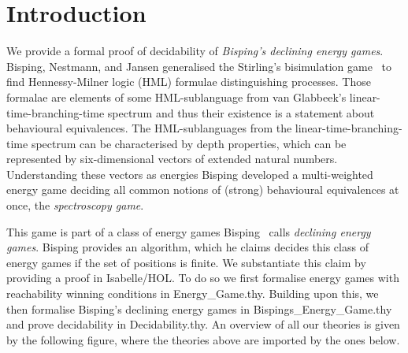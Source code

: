 \newpage
\section{Introduction}
 
\noindent
We provide a formal proof of decidability of \textit{Bisping's declining energy games}. 
Bisping, Nestmann, and Jansen \cite{bispingNestmann,bispingJansenNestmann} generalised the 
Stirling's bisimulation game~\cite{stirling-bisim} to find Hennessy-Milner logic (HML) formulae distinguishing 
processes. Those formalae are elements of some HML-sublanguage from 
van Glabbeek’s linear-time-branching-time spectrum\cite{vanGlabbeek} 
and thus their existence is a statement about behavioural equivalences.
The HML-sublanguages from the linear-time-branching-time spectrum can be characterised by depth properties, 
which can be represented by six-dimensional vectors of extended natural numbers. Understanding these 
vectors as energies Bisping\cite{bens-algo} developed a multi-weighted energy game deciding all common 
notions of (strong) behavioural equivalences at once, the \textit{spectroscopy game}. 

This game is part of a class of energy games Bisping~\cite{bens-algo} calls \textit{declining energy games}.
Bisping provides an algorithm, which he claims decides this class of energy games if the set of positions is finite.
We substantiate this claim by providing a proof in Isabelle/HOL.
To do so we first formalise energy games with reachability winning conditions in Energy\_Game.thy. 
Building upon this, we then formalise Bisping's declining energy games in Bispings\_Energy\_Game.thy and prove decidability in Decidability.thy.
An overview of all our theories is given by the following figure, where the theories above are imported by the ones below.

